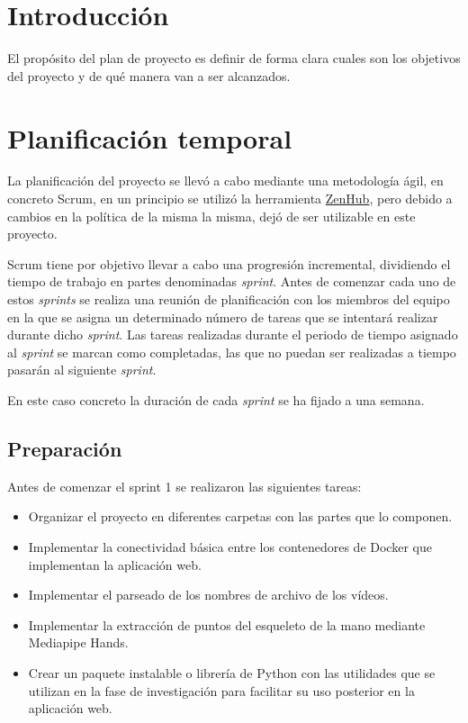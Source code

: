 \label{cha:Plan de Proyecto Software}

\section{Introducción}

El propósito del plan de proyecto es definir de forma clara cuales son los
objetivos del proyecto y de qué manera van a ser alcanzados.

\section{Planificación temporal}

La planificación del proyecto se llevó a cabo mediante una metodología ágil, en
concreto Scrum, en un principio se utilizó la herramienta
\href{https://www.zenhub.com/}{ZenHub}, pero debido a cambios en la política de
la misma la misma, dejó de ser utilizable en este proyecto.

Scrum tiene por objetivo llevar a cabo una progresión incremental, dividiendo el
tiempo de trabajo en partes denominadas \textit{sprint}. Antes de comenzar cada
uno de estos \textit{sprints} se realiza una reunión de planificación con los
miembros del equipo en la que se asigna un determinado número de tareas que se
intentará realizar durante dicho \textit{sprint}. Las tareas realizadas durante
el periodo de tiempo asignado al \textit{sprint} se marcan como completadas, las
que no puedan ser realizadas a tiempo pasarán al siguiente \textit{sprint}.

En este caso concreto la duración de cada \textit{sprint} se ha fijado a una
semana.

\subsection{Preparación}

Antes de comenzar el sprint 1 se realizaron las siguientes tareas:

\begin{itemize}
    \item Organizar el proyecto en diferentes carpetas con las partes que lo
          componen.
    \item Implementar la conectividad básica entre los contenedores de Docker
          que implementan la aplicación web.
    \item Implementar el parseado de los nombres de archivo de los vídeos.
    \item Implementar la extracción de puntos del esqueleto de la mano mediante
          Mediapipe Hands.
    \item Crear un paquete instalable o librería de Python con las utilidades
          que se utilizan en la fase de investigación para facilitar su uso
          posterior en la aplicación web.
\end{itemize}

